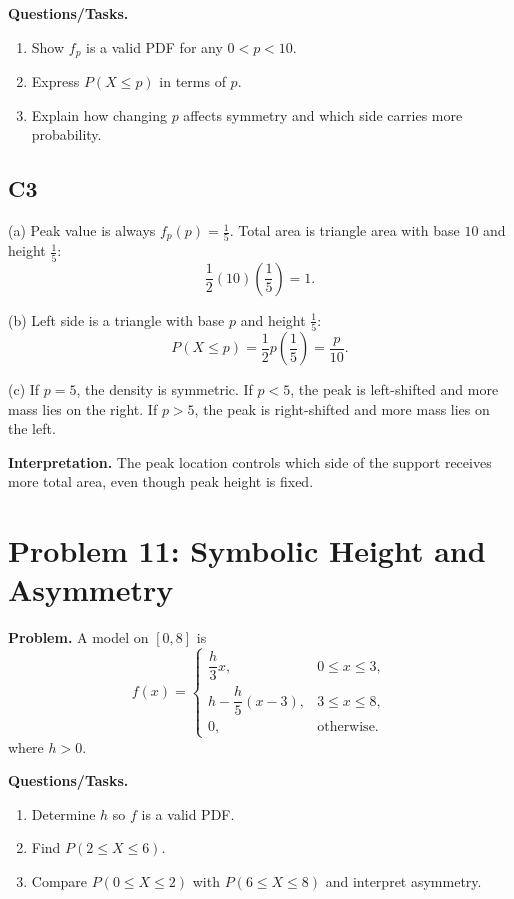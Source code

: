 \textbf{Questions/Tasks.}
\begin{enumerate}
\item Show $f_p$ is a valid PDF for any $0<p<10$.
\item Express $P(X\le p)$ in terms of $p$.
\item Explain how changing $p$ affects symmetry and which side carries more probability.
\end{enumerate}

\subsection*{C3}
(a) Peak value is always $f_p(p)=\frac15$.
Total area is triangle area with base $10$ and height $\frac15$:
\[
\frac12(10)\left(\frac15\right)=1.
\]

(b) Left side is a triangle with base $p$ and height $\frac15$:
\[
P(X\le p)=\frac12 p\left(\frac15\right)=\frac{p}{10}.
\]

(c) If $p=5$, the density is symmetric.
If $p<5$, the peak is left-shifted and more mass lies on the right.
If $p>5$, the peak is right-shifted and more mass lies on the left.

\textbf{Interpretation.}
The peak location controls which side of the support receives more total area, even though peak height is fixed.

\section{Problem 11: Symbolic Height and Asymmetry}

\textbf{Problem.}
A model on $[0,8]$ is
\[
f(x)=\begin{cases}
\dfrac{h}{3}x, & 0\le x\le 3,\\
h-\dfrac{h}{5}(x-3), & 3\le x\le 8,\\
0, & \text{otherwise.}
\end{cases}
\]
where $h>0$.

\textbf{Questions/Tasks.}
\begin{enumerate}
\item Determine $h$ so $f$ is a valid PDF.
\item Find $P(2\le X\le 6)$.
\item Compare $P(0\le X\le 2)$ with $P(6\le X\le 8)$ and interpret asymmetry.
\end{enumerate}

